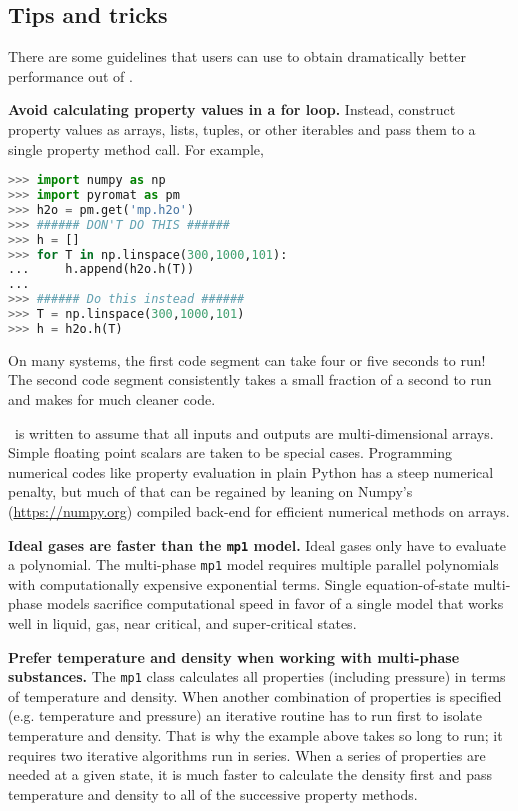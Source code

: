 \subsection{Tips and tricks}

There are some guidelines that users can use to obtain dramatically better performance out of \PM.

{\bf Avoid calculating property values in a for loop.}  Instead, construct property values as arrays, lists, tuples, or other iterables and pass them to a single property method call.  For example,
\begin{lstlisting}[language=Python]
>>> import numpy as np
>>> import pyromat as pm
>>> h2o = pm.get('mp.h2o')
>>> ###### DON'T DO THIS ######
>>> h = []
>>> for T in np.linspace(300,1000,101):
...     h.append(h2o.h(T))
... 
>>> ###### Do this instead ######
>>> T = np.linspace(300,1000,101)
>>> h = h2o.h(T)
\end{lstlisting}
On many systems, the first code segment can take four or five seconds to run!  The second code segment consistently takes a small fraction of a second to run and makes for much cleaner code.

\PM\ is written to assume that all inputs and outputs are multi-dimensional arrays.  Simple floating point scalars are taken to be special cases.  Programming numerical codes like property evaluation in plain Python has a steep numerical penalty, but much of that can be regained by leaning on Numpy's (\url{https://numpy.org}) compiled back-end for efficient numerical methods on arrays.

{\bf Ideal gases are faster than the \texttt{mp1} model.}  Ideal gases only have to evaluate a polynomial.  The multi-phase \texttt{mp1} model requires multiple parallel polynomials with computationally expensive exponential terms.  Single equation-of-state multi-phase models sacrifice computational speed in favor of a single model that works well in liquid, gas, near critical, and super-critical states.

{\bf Prefer temperature and density when working with multi-phase substances.}  The \texttt{mp1} class calculates all properties (including pressure) in terms of temperature and density.  When another combination of properties is specified (e.g. temperature and pressure) an iterative routine has to run first to isolate temperature and density.  That is why the example above takes so long to run; it requires two iterative algorithms run in series.  When a series of properties are needed at a given state, it is much faster to calculate the density first and pass temperature and density to all of the successive property methods.

